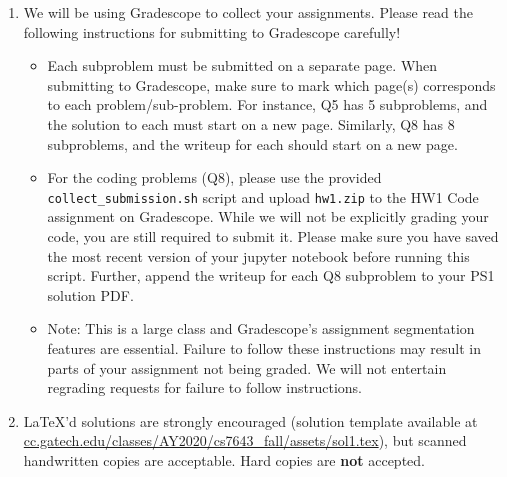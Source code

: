 \documentclass[11pt,english]{article}
\begin{document}
\begin{enumerate}
\item We will be using Gradescope to collect your assignments.  Please read the following instructions for submitting to Gradescope carefully!
     \begin{itemize}
          \item
               Each subproblem must be submitted on a separate page. When submitting to Gradescope, make sure to mark which page(s) corresponds to each problem/sub-problem. For instance, Q5 has 5 subproblems, and the solution to each 
               must start on a new page. Similarly, Q8 has 8 subproblems, and the writeup for each should start on a new page.
          \item
               For the coding problems (Q8), 
               please use the provided \texttt{collect\_submission.sh} script and upload \texttt{hw1.zip}
               to the HW1 Code assignment on Gradescope.  While we will not be explicitly grading your code,
               you are still required to submit it. Please make sure you have saved the most recent version of your jupyter notebook before running this script.
               Further, append the writeup for each Q8 subproblem to your PS1 solution PDF.
          \item
               Note: This is a large class and Gradescope's assignment segmentation features are essential.
               Failure to follow these instructions may result in parts of your assignment not being graded.
               We will not entertain regrading requests for failure to follow instructions.

     \end{itemize}

\item
     \LaTeX'd  solutions are strongly encouraged (solution template
     available at \\
     \href{https://www.cc.gatech.edu/classes/AY2020/cs7643_fall/assets/sol1.tex}
     {cc.gatech.edu/classes/AY2020/cs7643\_fall/assets/sol1.tex}),
     but scanned handwritten copies are acceptable.
     Hard copies are \textbf{not} accepted.



\end{enumerate}
\end{document}
